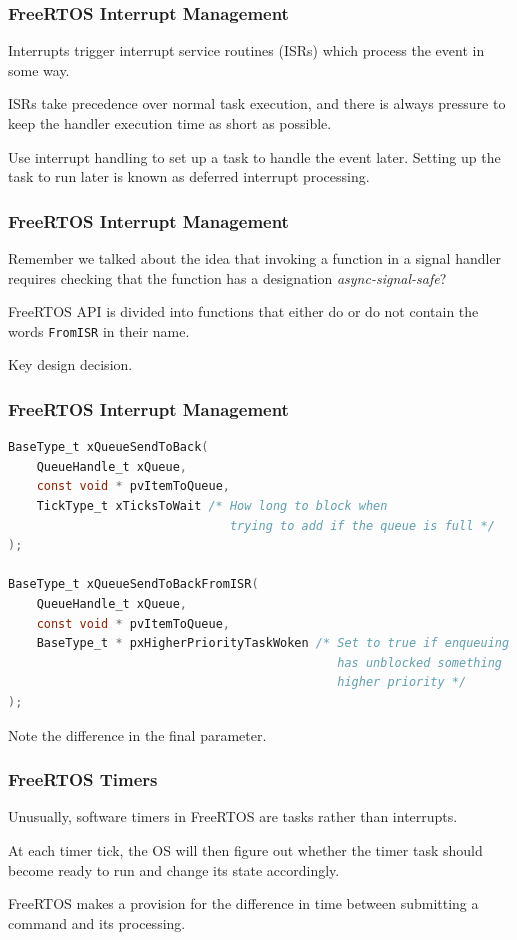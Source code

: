 \begin{frame}
\frametitle{FreeRTOS Interrupt Management}

Interrupts trigger interrupt service routines (ISRs) which process the event in some way. 

ISRs take precedence over normal task execution, and there is always pressure to keep the handler execution time as short as possible.

Use interrupt handling to set up a task to handle the event later. Setting up the task to run later is known as \alert{deferred interrupt processing}.

\end{frame}

\begin{frame}
\frametitle{FreeRTOS Interrupt Management}

Remember we talked about the idea that invoking a function in a signal handler requires checking that the function has a designation \textit{async-signal-safe}?

FreeRTOS API is divided into functions that either do or do not contain the words \texttt{FromISR} in their name.

Key design decision.

\end{frame}


\begin{frame}[fragile]
\frametitle{FreeRTOS Interrupt Management}

\begin{lstlisting}[language=C]
BaseType_t xQueueSendToBack(
    QueueHandle_t xQueue,
    const void * pvItemToQueue,
    TickType_t xTicksToWait /* How long to block when 
                               trying to add if the queue is full */
);

BaseType_t xQueueSendToBackFromISR(
    QueueHandle_t xQueue,
    const void * pvItemToQueue,
    BaseType_t * pxHigherPriorityTaskWoken /* Set to true if enqueuing
                                              has unblocked something 
                                              higher priority */
);
\end{lstlisting}

Note the difference in the final parameter.

\end{frame}


\begin{frame}
\frametitle{FreeRTOS Timers}

Unusually, software timers in FreeRTOS are tasks rather than interrupts. 

At each timer tick, the OS will then figure out whether the timer task should become ready to run and change its state accordingly.

FreeRTOS makes a provision for the difference in time between submitting a command and its processing.

\end{frame}


